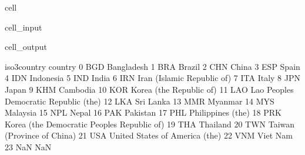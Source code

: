 \documentclass[letterpaper,10pt,english]{jupyterBook}
\begin{document}
\begin{sphinxuseclass}{cell}\begin{sphinxVerbatimInput}

\begin{sphinxuseclass}{cell_input}
\begin{sphinxVerbatim}[commandchars=\\\{\}]
\end{sphinxVerbatim}

\end{sphinxuseclass}\end{sphinxVerbatimInput}
\begin{sphinxVerbatimOutput}

\begin{sphinxuseclass}{cell_output}
\begin{sphinxVerbatim}[commandchars=\\\{\}]
   iso3\PYGZus{}country                                      country  \PYGZbs{}
0           BGD                                   Bangladesh   
1           BRA                                       Brazil   
2           CHN                                        China   
3           ESP                                        Spain   
4           IDN                                    Indonesia   
5           IND                                        India   
6           IRN                   Iran (Islamic Republic of)   
7           ITA                                        Italy   
8           JPN                                        Japan   
9           KHM                                     Cambodia   
10          KOR                      Korea (the Republic of)   
11          LAO       Lao People\PYGZsq{}s Democratic Republic (the)   
12          LKA                                    Sri Lanka   
13          MMR                                      Myanmar   
14          MYS                                     Malaysia   
15          NPL                                        Nepal   
16          PAK                                     Pakistan   
17          PHL                            Philippines (the)   
18          PRK  Korea (the Democratic People\PYGZsq{}s Republic of)   
19          THA                                     Thailand   
20          TWN                   Taiwan (Province of China)   
21          USA               United States of America (the)   
22          VNM                                     Viet Nam   
23          NaN                                          NaN   


\end{sphinxVerbatim}
\end{sphinxuseclass}
\end{sphinxVerbatimOutput}
\end{sphinxuseclass}
\end{document}
